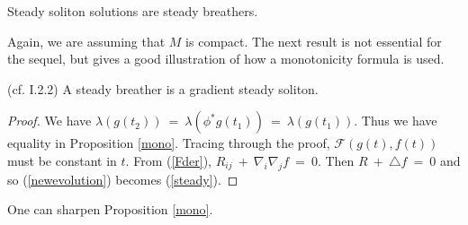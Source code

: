 Steady soliton solutions are steady breathers.

Again, we are assuming that $M$ is compact. The next result is not
essential for the sequel, but gives a good illustration of how a
monotonicity formula is used.

\begin{proposition}
  \label{prop:kl-invariant-its-applications-rigidity-steady-breathers}
  (cf. I.2.2) \label{steadybreather}
A steady breather is a gradient steady soliton.
\end{proposition}
\begin{proof}
We have $\lambda(g(t_2)) \: = \: \lambda(\phi^* g(t_1)) \: = \:
\lambda(g(t_1))$. Thus we have equality in Proposition
\ref{mono}. Tracing through the proof,
${\mathcal F}(g(t), f(t))$ must be constant in $t$. From
(\ref{Fder}), $R_{ij} \: + \: \nabla_i \nabla_j f \: = \: 0$.
Then $R \: + \: \triangle f \: = \: 0$ and so
(\ref{newevolution}) becomes (\ref{steady}).
\end{proof}

One can sharpen Proposition \ref{mono}.

